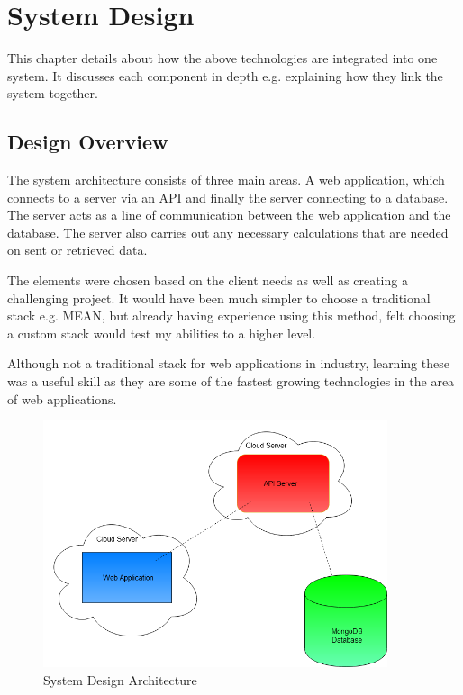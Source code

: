 \chapter{System Design}
This chapter details about how the above technologies are integrated into one system. It discusses each component in depth e.g. explaining how they link the system together.

\section{Design Overview}
The system architecture consists of three main areas. A web application, which connects to a server via an API and finally the server connecting to a database. The server acts as a line of communication between the web application and the database. The server also carries out any necessary calculations that are needed on sent or retrieved data.\par
The elements were chosen based on the client needs as well as creating a challenging project. It would have been much simpler to choose a traditional stack e.g. MEAN, but already having experience using this method, felt choosing a custom stack would test my abilities to a higher level.\par
Although not a traditional stack for web applications in industry, learning these was a useful skill as they are some of the fastest growing technologies in the area of web applications.
\newpage
\begin{figure}[h!]
 	\caption{System Design Architecture}
	\label{image:projectdesign}
 	\centering
 	\includegraphics[width=0.9\textwidth]{Images/Project Layout.png}
\end{figure}

